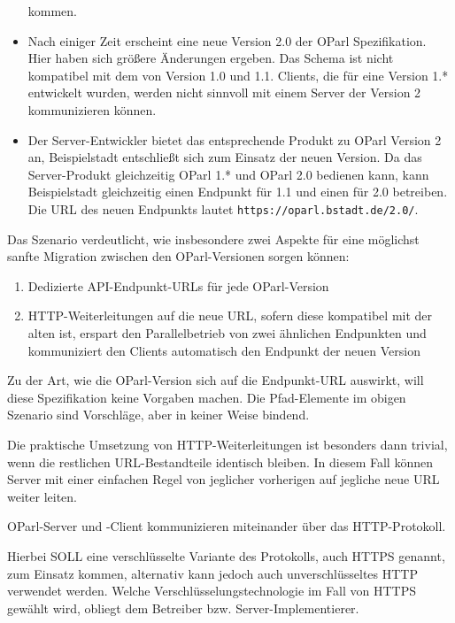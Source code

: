 \documentclass[,a4paper]{article}
\begin{document}
\begin{itemize}
  kommen.
\item
  Nach einiger Zeit erscheint eine neue Version 2.0 der OParl
  Spezifikation. Hier haben sich größere Änderungen ergeben. Das Schema
  ist nicht kompatibel mit dem von Version 1.0 und 1.1. Clients, die für
  eine Version 1.* entwickelt wurden, werden nicht sinnvoll mit einem
  Server der Version 2 kommunizieren können.
\item
  Der Server-Entwickler bietet das entsprechende Produkt zu OParl
  Version 2 an, Beispielstadt entschließt sich zum Einsatz der neuen
  Version. Da das Server-Produkt gleichzeitig OParl 1.* und OParl 2.0
  bedienen kann, kann Beispielstadt gleichzeitig einen Endpunkt für 1.1
  und einen für 2.0 betreiben. Die URL des neuen Endpunkts lautet
  \texttt{https://oparl.bstadt.de/2.0/}.
\end{itemize}

Das Szenario verdeutlicht, wie insbesondere zwei Aspekte für eine
möglichst sanfte Migration zwischen den OParl-Versionen sorgen können:

\begin{enumerate}
\def\labelenumi{\arabic{enumi}.}
\item
  Dedizierte API-Endpunkt-URLs für jede OParl-Version
\item
  HTTP-Weiterleitungen auf die neue URL, sofern diese kompatibel mit der
  alten ist, erspart den Parallelbetrieb von zwei ähnlichen Endpunkten
  und kommuniziert den Clients automatisch den Endpunkt der neuen
  Version
\end{enumerate}

Zu der Art, wie die OParl-Version sich auf die Endpunkt-URL auswirkt,
will diese Spezifikation keine Vorgaben machen. Die Pfad-Elemente im
obigen Szenario sind Vorschläge, aber in keiner Weise bindend.

Die praktische Umsetzung von HTTP-Weiterleitungen ist besonders dann
trivial, wenn die restlichen URL-Bestandteile identisch bleiben. In
diesem Fall können Server mit einer einfachen Regel von jeglicher
vorherigen auf jegliche neue URL weiter leiten.


OParl-Server und -Client kommunizieren miteinander über das
HTTP-Protokoll.

Hierbei SOLL eine verschlüsselte Variante des Protokolls, auch HTTPS
genannt, zum Einsatz kommen, alternativ kann jedoch auch
unverschlüsseltes HTTP verwendet werden. Welche
Verschlüsselungstechnologie im Fall von HTTPS gewählt wird, obliegt dem
Betreiber bzw. Server-Implementierer.
\end{document}
